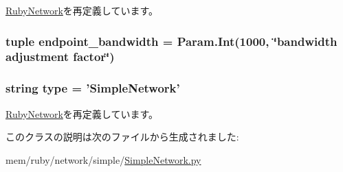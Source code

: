 \hyperlink{classNetwork_1_1RubyNetwork_a17da7064bc5c518791f0c891eff05fda}{RubyNetwork}を再定義しています。\hypertarget{classSimpleNetwork_1_1SimpleNetwork_aaa8f6361a828ef28c2d06ac81d57bf1b}{
\subsubsection[{endpoint\_\-bandwidth}]{\setlength{\rightskip}{0pt plus 5cm}tuple {\bf endpoint\_\-bandwidth} = Param.Int(1000, \char`\"{}bandwidth adjustment factor\char`\"{})}}
\label{classSimpleNetwork_1_1SimpleNetwork_aaa8f6361a828ef28c2d06ac81d57bf1b}
\hypertarget{classSimpleNetwork_1_1SimpleNetwork_acce15679d830831b0bbe8ebc2a60b2ca}{
\subsubsection[{type}]{\setlength{\rightskip}{0pt plus 5cm}string {\bf type} = '{\bf SimpleNetwork}'}}
\label{classSimpleNetwork_1_1SimpleNetwork_acce15679d830831b0bbe8ebc2a60b2ca}


\hyperlink{classNetwork_1_1RubyNetwork_acce15679d830831b0bbe8ebc2a60b2ca}{RubyNetwork}を再定義しています。

このクラスの説明は次のファイルから生成されました:\begin{DoxyCompactItemize}
\item 
mem/ruby/network/simple/\hyperlink{SimpleNetwork_8py}{SimpleNetwork.py}\end{DoxyCompactItemize}
